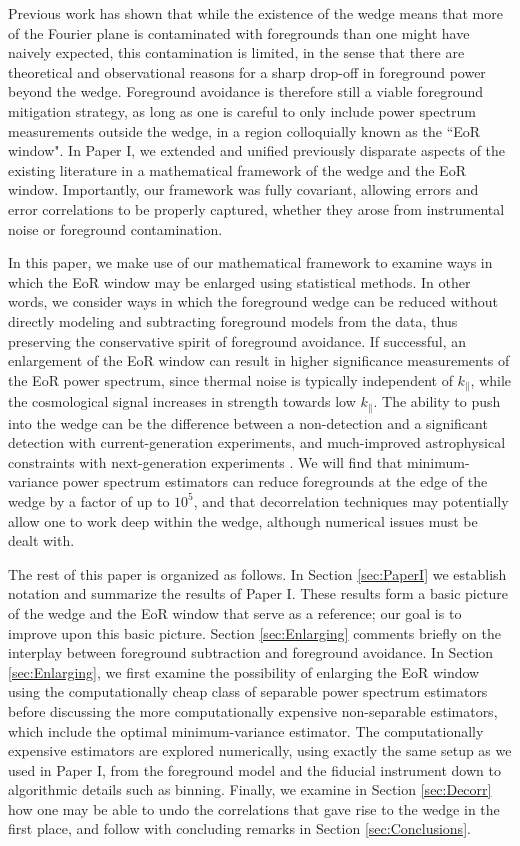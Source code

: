 \documentclass[twocolumn,aps,prd,nofootinbib,showpacs]{revtex4-1}
\begin{document}
Previous work has shown that while the existence of the wedge means that more of the Fourier plane is contaminated with foregrounds than one might have naively expected, this contamination is limited, in the sense that there are theoretical and observational reasons for a sharp drop-off in foreground power beyond the wedge.  Foreground avoidance is therefore still a viable foreground mitigation strategy, as long as one is careful to only include power spectrum measurements outside the wedge, in a region colloquially known as the ``EoR window".  In Paper I, we extended and unified previously disparate aspects of the existing literature in a mathematical framework of the wedge and the EoR window.  Importantly, our framework was fully covariant, allowing errors and error correlations to be properly captured, whether they arose from instrumental noise or foreground contamination.

In this paper, we make use of our mathematical framework to examine ways in which the EoR window may be enlarged using statistical methods.  In other words, we consider ways in which the foreground wedge can be reduced without directly modeling and subtracting foreground models from the data, thus preserving the conservative spirit of foreground avoidance.  If successful, an enlargement of the EoR window can result in higher significance measurements of the EoR power spectrum, since thermal noise is typically independent of $k_\parallel$, while the cosmological signal increases in strength towards low $k_\parallel$.  The ability to push into the wedge can be the difference between a non-detection and a significant detection with current-generation experiments, and much-improved astrophysical constraints with next-generation experiments \cite{Pober2014}.  We will find that minimum-variance power spectrum estimators can reduce foregrounds at the edge of the wedge by a factor of up to $10^5$, and that decorrelation techniques may potentially allow one to work deep within the wedge, although numerical issues must be dealt with.

The rest of this paper is organized as follows.  In Section \ref{sec:PaperI} we establish notation and summarize the results of Paper I.  These results form a basic picture of the wedge and the EoR window that serve as a reference; our goal is to improve upon this basic picture.  Section \ref{sec:Enlarging} comments briefly on the interplay between foreground subtraction and foreground avoidance.  In Section \ref{sec:Enlarging}, we first examine the possibility of enlarging the EoR window using the computationally cheap class of separable power spectrum estimators before discussing the more computationally expensive non-separable estimators, which include the optimal minimum-variance estimator.  The computationally expensive estimators are explored numerically, using exactly the same setup as we used in Paper I, from the foreground model and the fiducial instrument down to algorithmic details such as binning.  Finally, we examine in Section \ref{sec:Decorr} how one may be able to undo the correlations that gave rise to the wedge in the first place, and follow with concluding remarks in Section \ref{sec:Conclusions}.
\end{document}
